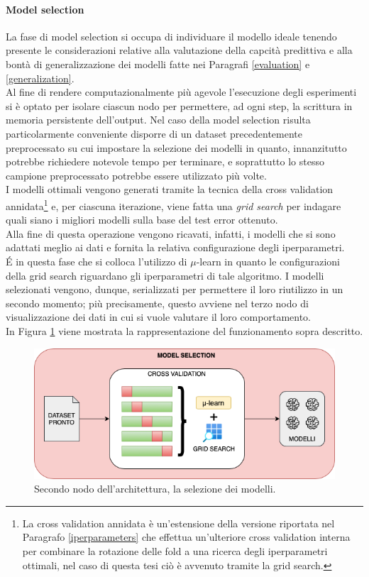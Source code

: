 \documentclass[12pt]{report}
\theoremstyle{definition}
\begin{document}
\paragraph{Model selection}
La fase di model selection si occupa di individuare il modello ideale tenendo presente le considerazioni relative alla valutazione della capcità predittiva e alla bontà di generalizzazione dei modelli fatte nei Paragrafi \ref{evaluation} e \ref{generalization}.
\\
Al fine di rendere computazionalmente più agevole l'esecuzione degli esperimenti si è optato per isolare ciascun nodo per permettere, ad ogni step, la scrittura in memoria persistente dell'output. Nel caso della model selection risulta particolarmente conveniente disporre di un dataset precedentemente preprocessato su cui impostare la selezione dei modelli in quanto, innanzitutto potrebbe richiedere notevole tempo per terminare, e soprattutto lo stesso campione preprocessato potrebbe essere utilizzato più volte.
\\
I modelli ottimali vengono generati tramite la tecnica della cross validation annidata\footnote{La cross validation annidata è un'estensione della versione riportata nel Paragrafo \ref{iperparameters} che effettua un'ulteriore cross validation interna per combinare la rotazione delle fold a una ricerca degli iperparametri ottimali, nel caso di questa tesi ciò è avvenuto tramite la grid search.} e, per ciascuna iterazione, viene fatta una \textit{grid search} per indagare quali siano i migliori modelli sulla base del test error ottenuto.
\\
Alla fine di questa operazione vengono ricavati, infatti, i modelli che si sono adattati meglio ai dati e fornita la relativa configurazione degli iperparametri.
\\
\'E in questa fase che si colloca l'utilizzo di $\mu$-learn in quanto le configurazioni della grid search riguardano gli iperparametri di tale algoritmo.
I modelli selezionati vengono, dunque, serializzati per permettere il loro riutilizzo in un secondo momento; più precisamente, questo avviene nel terzo nodo di visualizzazione dei dati in cui si vuole valutare il loro comportamento.
\\
In Figura \ref{selectionmodel} viene mostrata la rappresentazione del funzionamento sopra descritto.
\begin{figure}
    \centering
    \includegraphics[scale=0.6]{images/modelselectionmodule.png}
    \caption{Secondo nodo dell'architettura, la selezione dei modelli.}
    \label{selectionmodel}
\end{figure}
\end{document}
